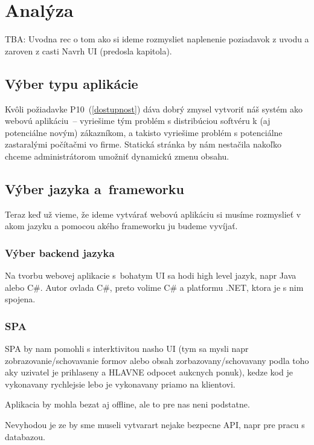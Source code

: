 \chapter{Analýza}

TBA: Uvodna rec o tom ako si ideme rozmysliet naplenenie poziadavok z uvodu a zaroven z casti Navrh UI (predosla kapitola).

\section{Výber typu aplikácie}

Kvôli požiadavke P10~(\ref{dostupnost}) dáva dobrý zmysel vytvoriť náš systém ako webovú aplikáciu~-- vyriešime tým problém s distribúciou softvéru k (aj potenciálne novým) zákazníkom, a takisto vyriešime problém s potenciálne zastaralými počítačmi vo firme. Statická stránka by nám nestačila nakoľko chceme administrátorom umožniť dynamickú zmenu obsahu.

\section{Výber jazyka a~frameworku}

Teraz keď už vieme, že ideme vytvárať webovú aplikáciu si musíme rozmyslieť v akom jazyku a pomocou akého frameworku ju budeme vyvíjať.

\subsection{Výber backend jazyka}

Na tvorbu webovej aplikacie s~bohatym UI sa hodi high level jazyk, napr Java alebo C\#. Autor ovlada C\#, preto volime C\# a platformu .NET, ktora je s nim spojena.

\subsection{SPA}

SPA by nam pomohli s interktivitou nasho UI (tym sa mysli napr zobrazovanie/schovavanie formov alebo obsah zorbazovany/schovavany podla toho aky uzivatel je prihlaseny a HLAVNE odpocet aukcnych ponuk), kedze kod je vykonavany rychlejsie lebo je vykonavany priamo na klientovi.

Aplikacia by mohla bezat aj offline, ale to pre nas neni podstatne.

Nevyhodou je ze by sme museli vytvarart nejake bezpecne API, napr pre pracu s databazou.

